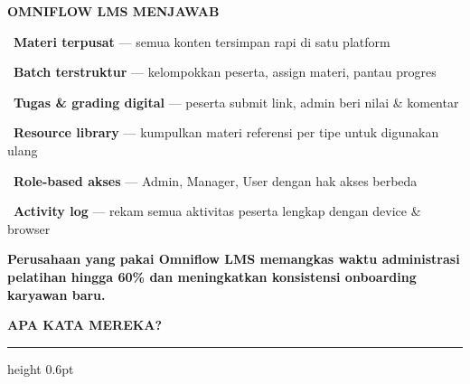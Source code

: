\documentclass[a4paper]{article}
\newcommand{\sectiontitle}[1]{%
    \vspace{10pt}%
    {\fontsize{13}{16}\selectfont\bfseries\color{BlueDark} #1}\par\vspace{3pt}%
    {\color{BluePrimary}\hrule height 0.6pt}\par\vspace{8pt}%
}
\begin{document}
\begin{minipage}[t]{0.485\textwidth}
    \colorbox{VioletPrimary}{%
        \begin{minipage}{\dimexpr\textwidth-14pt}
            \vspace{5pt}
            {\fontsize{10}{13}\selectfont\bfseries\color{White} OMNIFLOW LMS MENJAWAB}
            \vspace{5pt}
        \end{minipage}}
    \vspace{6pt}

    {\fontsize{9.5}{13}\selectfont\color{TextDark}%
    \textbullet\ \textbf{Materi terpusat} --- semua konten tersimpan rapi di satu platform\par\vspace{4pt}%
    \textbullet\ \textbf{Batch terstruktur} --- kelompokkan peserta, assign materi, pantau progres\par\vspace{4pt}%
    \textbullet\ \textbf{Tugas \& grading digital} --- peserta submit link, admin beri nilai \& komentar\par\vspace{4pt}%
    \textbullet\ \textbf{Resource library} --- kumpulkan materi referensi per tipe untuk digunakan ulang\par\vspace{4pt}%
    \textbullet\ \textbf{Role-based akses} --- Admin, Manager, User dengan hak akses berbeda\par\vspace{4pt}%
    \textbullet\ \textbf{Activity log} --- rekam semua aktivitas peserta lengkap dengan device \& browser}%
\end{minipage}

\vspace{8pt}

{\setlength{\fboxsep}{7pt}\setlength{\fboxrule}{0pt}%
\noindent\colorbox{VioletPrimary}{%
    \begin{minipage}{\dimexpr\textwidth-2\fboxsep\relax}
        \centering
        {\fontsize{9.5}{12}\selectfont\bfseries\color{White}
        Perusahaan yang pakai Omniflow LMS memangkas \textbf{waktu administrasi pelatihan hingga 60\%} dan meningkatkan konsistensi onboarding karyawan baru.}
    \end{minipage}}}

\vspace{8pt}
\sectiontitle{APA KATA MEREKA?}
\end{document}
